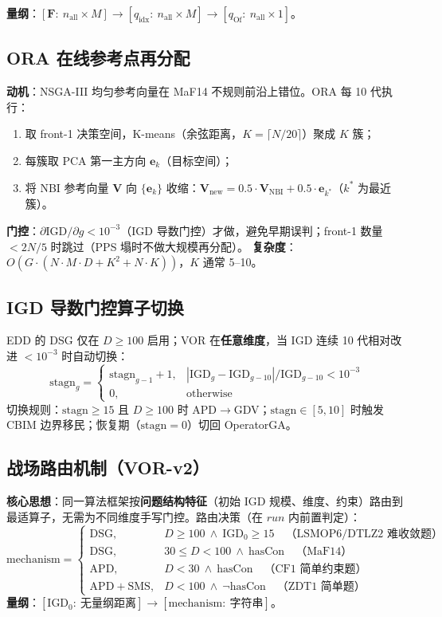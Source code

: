 \documentclass[a4paper,11pt]{article}
\begin{document}
\textbf{量纲}：$[\mathbf{F}:\ n_{\text{all}}\times M]\to[q_{\text{idx}}:\ n_{\text{all}}\times M]\to[q_{\text{Of}}:\ n_{\text{all}}\times1]$。

\subsection{ORA 在线参考点再分配}
\label{sec:ora}
\textbf{动机}：NSGA-III 均匀参考向量在 MaF14 不规则前沿上错位。ORA 每 10 代执行：
\begin{enumerate}
\item 取 front-1 决策空间，K-means（余弦距离，$K=\lceil N/20\rceil$）聚成 $K$ 簇；
\item 每簇取 PCA 第一主方向 $\mathbf{e}_k$（目标空间）；
\item 将 NBI 参考向量 $\mathbf{V}$ 向 $\{\mathbf{e}_k\}$ 收缩：$\mathbf{V}_{\text{new}}=0.5\cdot\mathbf{V}_{\text{NBI}}+0.5\cdot\mathbf{e}_{k^*}$（$k^*$ 为最近簇）。
\end{enumerate}
\textbf{门控}：$\partial\text{IGD}/\partial g<10^{-3}$（IGD 导数门控）才做，避免早期误判；front-1 数量 $<2N/5$ 时跳过（PPS 塌时不做大规模再分配）。
\textbf{复杂度}：$O(G\cdot(N\cdot M\cdot D+K^2+N\cdot K))$，$K$ 通常 5--10。

\subsection{IGD 导数门控算子切换}
\label{sec:igdgate}
EDD 的 DSG 仅在 $D\geq100$ 启用；VOR 在\textbf{任意维度}，当 IGD 连续 10 代相对改进 $<10^{-3}$ 时自动切换：
\begin{equation}
\text{stagn}_{g}=
\begin{cases}
\text{stagn}_{g-1}+1, & \left|\text{IGD}_g-\text{IGD}_{g-10}\right|/\text{IGD}_{g-10}<10^{-3}\\
0, & \text{otherwise}
\end{cases}
\end{equation}
切换规则：$\text{stagn}\geq15$ 且 $D\geq100$ 时 APD$\to$GDV；$\text{stagn}\in[5,10]$ 时触发 CBIM 边界移民；恢复期（$\text{stagn}=0$）切回 OperatorGA。

\subsection{战场路由机制（VOR-v2）}
\label{sec:routing}
\textbf{核心思想}：同一算法框架按\textbf{问题结构特征}（初始 IGD 规模、维度、约束）路由到最适算子，无需为不同维度手写门控。路由决策（在 $run$ 内前置判定）：
\begin{equation}
\text{mechanism}=
\begin{cases}
\text{DSG}, & D\geq100\ \wedge\ \text{IGD}_0\geq15\quad\text{（LSMOP6/DTLZ2 难收敛题）}\\
\text{DSG}, & 30\leq D<100\ \wedge\ \text{hasCon}\quad\text{（MaF14）}\\
\text{APD}, & D<30\ \wedge\ \text{hasCon}\quad\text{（CF1 简单约束题）}\\
\text{APD}+\text{SMS}, & D<100\ \wedge\ \neg\text{hasCon}\quad\text{（ZDT1 简单题）}
\end{cases}
\end{equation}
\textbf{量纲}：$[\text{IGD}_0:\ \text{无量纲距离}]\to[\text{mechanism}:\ \text{字符串}]$。
\end{document}
